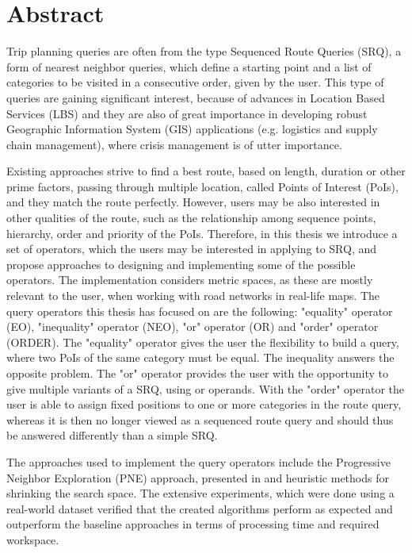 \chapter{Abstract}
\enlargethispage*{30pt}

Trip planning queries are often from the type Sequenced Route Queries (SRQ), a form of nearest neighbor queries, which define a starting point and a list of categories to be visited in a consecutive order, given by the user. This type of queries are gaining significant interest, because of advances in Location Based Services (LBS) and they are also of great importance in developing robust Geographic Information System (GIS) applications (e.g. logistics and supply chain management), where crisis management is of utter importance. 

Existing approaches strive to find a best route, based on length, duration or other prime factors, passing through multiple location, called Points of Interest (PoIs), and they match the route perfectly. However, users may be also interested in other qualities of the route, such as the relationship among sequence points, hierarchy, order and priority of the PoIs. Therefore, in this thesis we introduce a set of operators, which the users may be interested in applying to SRQ, and propose approaches to designing and implementing some of the possible operators. The implementation considers metric spaces, as these are mostly relevant to the user, when working with road networks in real-life maps.
The query operators this thesis has focused on are the following: "equality" operator (EO), "inequality" operator (NEO), "or" operator (OR) and "order" operator (ORDER). The "equality" operator gives the user the flexibility to build a query, where two PoIs of the same category must be equal. The inequality answers the opposite problem. The "or" operator provides the user with the opportunity to give multiple variants of a SRQ, using or operands. With the "order" operator the user is able to assign fixed positions to one or more categories in the route query, whereas it is then no longer viewed as a sequenced route query and should thus be answered differently than a simple SRQ.

The approaches used to implement the query operators include the Progressive Neighbor Exploration (PNE) approach, presented in \cite{OSR} and heuristic methods for shrinking the search space. The extensive experiments, which were done using a real-world dataset verified that the created algorithms perform as expected and outperform the baseline approaches in terms of processing time and required workspace.

\pagebreak